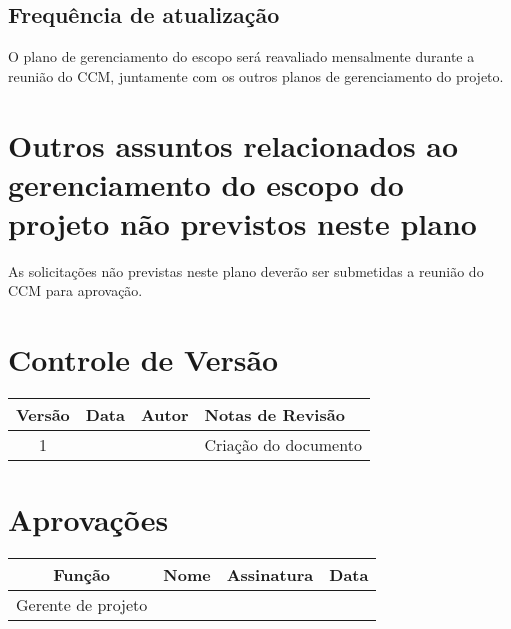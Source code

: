 \subsection{Frequência de atualização}

O plano de gerenciamento do escopo será reavaliado mensalmente durante a reunião do CCM, juntamente com os outros planos de gerenciamento do projeto.

\section{Outros assuntos relacionados ao gerenciamento do escopo do projeto não previstos neste plano}

As solicitações não previstas neste plano deverão ser submetidas a reunião do CCM para aprovação.

\section{Controle de Versão}

\begin{table}[H]
	\begin{tabularx}{\textwidth}{| c | c | X | X |}
		\hline
		\textbf{Versão} & \textbf{Data} & \textbf{Autor}      & \textbf{Notas de Revisão} \\
		\hline
		1                &               & \projectManagerName & Criação do documento     \\
		\hline
	\end{tabularx}
	\centering
\end{table}

\section{Aprovações}

\begin{table}[H]
	\begin{tabularx}{\textwidth}{| c | c | X | c |}
		\hline
		\textbf{Função}  & \textbf{Nome}       & \textbf{Assinatura}      & \textbf{Data} \\
		\hline
		Gerente de projeto & \projectManagerName & \projectManagerSignature &               \\
		\hline
	\end{tabularx}
	\centering
\end{table}